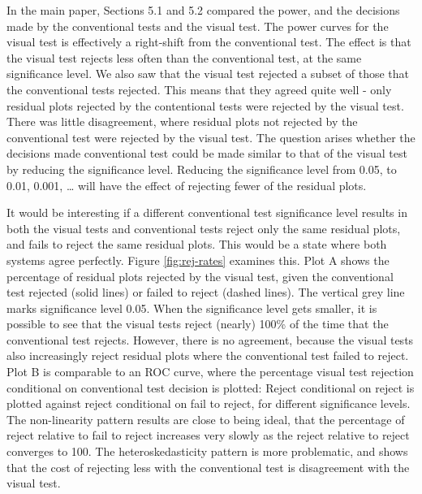 \documentclass[]{interact}
\theoremstyle{plain}%
\theoremstyle{definition}
\theoremstyle{remark}
\begin{document}
In the main paper, Sections 5.1 and 5.2 compared the power, and the
decisions made by the conventional tests and the visual test. The power
curves for the visual test is effectively a right-shift from the
conventional test. The effect is that the visual test rejects less often
than the conventional test, at the same significance level. We also saw
that the visual test rejected a subset of those that the conventional
tests rejected. This means that they agreed quite well - only residual
plots rejected by the contentional tests were rejected by the visual
test. There was little disagreement, where residual plots not rejected
by the conventional test were rejected by the visual test. The question
arises whether the decisions made conventional test could be made
similar to that of the visual test by reducing the significance level.
Reducing the significance level from 0.05, to 0.01, 0.001, \ldots{} will
have the effect of rejecting fewer of the residual plots.

It would be interesting if a different conventional test significance
level results in both the visual tests and conventional tests reject
only the same residual plots, and fails to reject the same residual
plots. This would be a state where both systems agree perfectly. Figure
\ref{fig:rej-rates} examines this. Plot A shows the percentage of
residual plots rejected by the visual test, given the conventional test
rejected (solid lines) or failed to reject (dashed lines). The vertical
grey line marks significance level 0.05. When the significance level
gets smaller, it is possible to see that the visual tests reject
(nearly) 100\% of the time that the conventional test rejects. However,
there is no agreement, because the visual tests also increasingly reject
residual plots where the conventional test failed to reject. Plot B is
comparable to an ROC curve, where the percentage visual test rejection
conditional on conventional test decision is plotted: Reject conditional
on reject is plotted against reject conditional on fail to reject, for
different significance levels. The non-linearity pattern results are
close to being ideal, that the percentage of reject relative to fail to
reject increases very slowly as the reject relative to reject converges
to 100. The heteroskedasticity pattern is more problematic, and shows
that the cost of rejecting less with the conventional test is
disagreement with the visual test.
\end{document}
